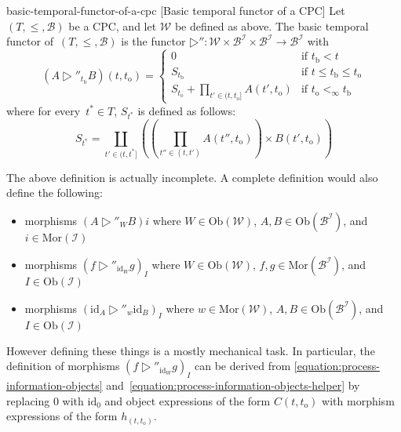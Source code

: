 \documentclass[copyright,creativecommons]{eptcs}
\newcommand{\Ob}{\mathrm{Ob}}
\newcommand{\Mor}{\mathrm{Mor}}
\newcommand{\id}{\mathrm{id}}
\newcommand{\timebound}{t_{\mathrm b}}
\newcommand{\obstime}{t_{\mathrm o}}
\begin{document}
\begin{extdefinition}{basic-temporal-functor-of-a-cpc}
                     [Basic temporal functor of a CPC]
Let $(T, ≤, ℬ)$ be a CPC, and let $𝒲$ be defined as above. The basic temporal
functor of~$(T, ≤, ℬ)$ is the functor $▷″ : 𝒲 × ℬ^ℐ × ℬ^ℐ → ℬ^ℐ$ with
\begin{equation}
\label{equation:process-information-objects}
\left(A ▷″_{\timebound} B \right)(t, \obstime)
    = \begin{cases}
0                                                     & \text{if $\timebound < t$}            \\
      S_{\timebound}                                        & \text{if $t ≤ \timebound ≤ \obstime$} \\
      S_{\obstime} + ∏_{t′ ∈ (t, \obstime]} A(t′, \obstime) & \text{if $\obstime <_∞ \timebound$}
\end{cases}
\end{equation}
where for every~$t^* ∈ T$, $S_{t^*}$ is defined as follows:
\begin{equation}
\label{equation:process-information-objects-helper}
S_{t^*} = ∐_{t′ ∈ (t, t^*]} \left(\left(∏_{t″ ∈ (t, t′)} A(t″, \obstime)\right) × B(t′, \obstime)\right)
\end{equation}
\end{extdefinition}

The above definition is actually incomplete. A complete definition would also
define the following:
\begin{itemize}

\item

morphisms $\left(A ▷″_W B\right)i$ where $W ∈ \Ob(𝒲)$, $A, B ∈
\Ob\left(ℬ^ℐ\right)$, and $i ∈ \Mor(ℐ)$

\item

morphisms $\left(f ▷″_{\id_W} g\right)_I$ where $W ∈ \Ob(𝒲)$, $f, g ∈
\Mor\left(ℬ^ℐ\right)$, and $I ∈ \Ob(ℐ)$

\item

morphisms $\left(\id_A ▷″_w \id_B\right)_I$ where $w ∈ \Mor(𝒲)$, $A, B ∈
\Ob\left(ℬ^ℐ\right)$, and $I ∈ \Ob(ℐ)$

\end{itemize}
However defining these things is a mostly mechanical task. In particular, the
definition of morphisms $\left(f ▷″_{\id_W} g\right)_I$ can be derived from
\eqref{equation:process-information-objects}
and~\eqref{equation:process-information-objects-helper} by replacing $0$ with
$\id_0$ and object expressions of the form $C(t, \obstime)$ with morphism
expressions of the form $h_{(t, \obstime)}$.
\end{document}
